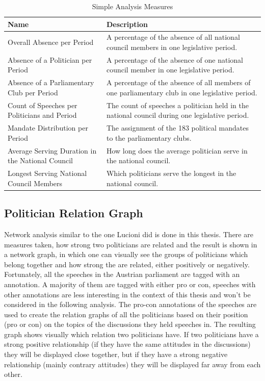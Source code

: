 \begin{table}[h]

\bgroup
\def\arraystretch{1.2}
\begin{tabular}{| p{5cm} | p{8cm} |}
\hline
  Name & Description \\
\hline
\hline
  Overall Absence per Period & A percentage of the absence of all national council members in one legislative period. \\
\hline
Absence of a Politician per Period & A percentage of the absence of one national council member in one legislative period. \\
\hline
Absence of a Parliamentary Club per Period & A percentage of the absence of all members of one parliamentary club in one legislative period. \\
\hline
Count of Speeches per Politicians and Period & The count of speeches a politician held in the national council during one legislative period. \\
\hline
Mandate Distribution per Period & The assignment of the 183 political mandates to the parliamentary clubs. \\
\hline
Average Serving Duration in the National Council & How long does the average politician serve in the national council. \\
\hline
Longest Serving National Council Members & Which politicians serve the longest in the national council. \\
\hline

\end{tabular}
\egroup

\caption{Simple Analysis Measures}
\label{table:simple_analysis}
\end{table}

\subsection{Politician Relation Graph}
\label{sec:pol_relation_graph}
Network analysis similar to the one Lucioni \cite{Lucioni_2015} did is done in this thesis. There are measures taken, how strong two politicians are related and the result is shown in a network graph, in which one can visually see the groups of politicians which belong together and how strong the are related, either positively or negatively. Fortunately, all the speeches in the Austrian parliament are tagged with an annotation. A majority of them are tagged with either pro or con, speeches with other annotations are less interesting in the context of this thesis and won't be considered in the following analysis. The pro-con annotations of the speeches are used to create the relation graphs of all the politicians based on their position (pro or con) on the topics of the discussions they held speeches in. The resulting graph shows visually which relation two politicians have. If two politicians have a strong positive relationship (if they have the same attitudes in the discussions) they will be displayed close together, but if they have a strong negative relationship (mainly contrary attitudes) they will be displayed far away from each other.


